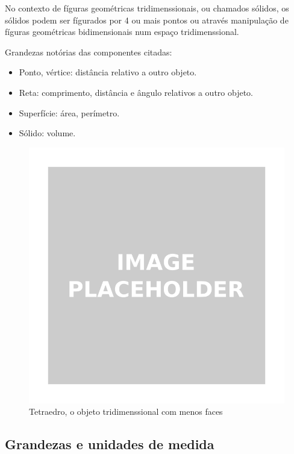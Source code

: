 \begin{multicols*}{2}
    No contexto de fíguras geométricas tridimenssionais, ou chamados sólidos, os sólidos podem ser fígurados por 4 ou 
    mais pontos ou através manipulação de fíguras geométricas bidimensionais num espaço tridimenssional. 
    
    Grandezas notórias das componentes citadas:
    \begin{itemize}
        \setlength\itemsep{1.15pt}
        \item Ponto, vértice: distância relativo a outro objeto.
        \item Reta: comprimento, distância e ângulo relativos a outro objeto.
        \item Superfície: área, perímetro.
        \item Sólido: volume.
    \end{itemize}

    \begin{figure}[H]
       \centering
       \includegraphics[width=0.7\columnwidth]{assets/image_placeholder.png}
       \caption{Tetraedro, o objeto tridimenssional com menos faces}
    \end{figure}

    \subsection*{Grandezas e unidades de medida}

\end{multicols*}
